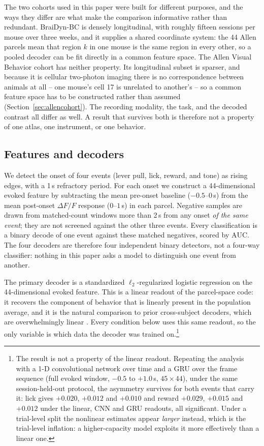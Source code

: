 \documentclass[mlabstract,onecolumn]{jmlr}
\newcommand{\auc}{\mathrm{AUC}}
\begin{document}
The two cohorts used in this paper were built for different purposes, and the ways they differ are
what make the comparison informative rather than redundant. BraiDyn-BC is densely longitudinal, with
roughly fifteen sessions per mouse over three weeks, and it supplies a shared coordinate system: the
44 Allen parcels mean that region $k$ in one mouse is the same region in every other, so a pooled
decoder can be fit directly in a common feature space. The Allen Visual Behavior cohort has neither
property. Its longitudinal subset is sparser, and because it is cellular two-photon imaging there is
no correspondence between animals at all -- one mouse's cell 17 is unrelated to another's -- so a
common feature space has to be constructed rather than assumed (Section~\ref{sec:allencohort}). The
recording modality, the task, and the decoded contrast all differ as well. A result that survives
both is therefore not a property of one atlas, one instrument, or one behavior.

\subsection{Features and decoders}
We detect the onset of four events (lever pull, lick, reward, and
tone) as rising edges, with a 1\,s refractory period. For each onset we construct a 44-dimensional
evoked feature by subtracting the mean pre-onset baseline ($-0.5$--$0$\,s) from the mean post-onset
$\Delta F/F$ response ($0$--$1$\,s) in each parcel. Negative samples are drawn from matched-count
windows more than 2\,s from any onset \emph{of the same event}; they are not screened against the
other three events. Every
classification is a binary decode of one event against these matched negatives, scored by $\auc$. The four decoders are therefore four independent binary detectors, not a
four-way classifier: nothing in this paper asks a model to distinguish one event from another.

The primary decoder is a standardized $\ell_2$-regularized logistic regression on
the 44-dimensional evoked feature. This is a linear readout of the parcel-space code: it recovers the
component of behavior that is linearly present in the population average, and it is the natural
comparison to prior cross-subject decoders, which are overwhelmingly linear
\citep{melbaum2022,peterson2021}. Every condition below uses this same readout, so the only variable
is which data the decoder was trained on.\footnote{The result is not a property of the linear
readout. Repeating the analysis with a 1-D convolutional network over time and a GRU over the frame
sequence (full evoked window, $-0.5$ to $+1.0$\,s, $45 \times 44$), under the same session-held-out
protocol, the asymmetry survives for both events that carry it: lick gives $+0.020$, $+0.012$ and
$+0.010$ and reward $+0.029$, $+0.015$ and $+0.012$ under the linear, CNN and GRU readouts, all
significant. Under a trial-level split the nonlinear estimates appear \emph{larger} instead, which is
the trial-level inflation: a higher-capacity model exploits it more effectively
than a linear one.}
\end{document}
